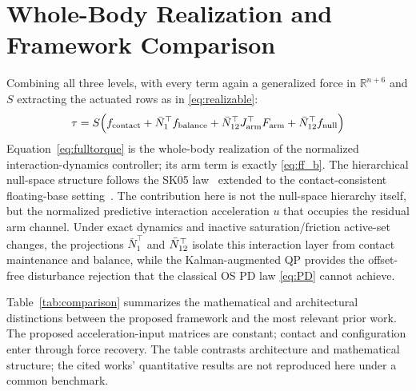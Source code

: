 \section{Whole-Body Realization and Framework Comparison}
\label{sec:torque}

Combining all three levels, with every term again a generalized force in
$\mathbb{R}^{n+6}$ and $S$ extracting the actuated rows as in
\eqref{eq:realizable}:
\begin{equation}\label{eq:fulltorque}
  \tau = S\Big(f_{\text{contact}}
       + \bar{N}_1^\top f_{\text{balance}}
       + \bar{N}_{12}^\top J_{\text{arm}}^\top F_{\text{arm}}
       + \bar{N}_{12}^\top f_{\text{null}}\Big)
\end{equation}
Equation~\eqref{eq:fulltorque} is the whole-body realization of the
normalized interaction-dynamics controller; its arm term is exactly
\eqref{eq:ff_b}.
The hierarchical null-space structure follows the SK05
law~\cite{sentis2005synthesis} extended to the contact-consistent
floating-base setting~\cite{khatib1987unified,righetti2011inverse}.
The contribution here is not the null-space hierarchy itself, but the
normalized predictive interaction acceleration $u$ that occupies the residual
arm channel. Under exact dynamics and inactive saturation/friction active-set
changes, the projections $\bar{N}_1^\top$ and $\bar{N}_{12}^\top$ isolate this
interaction layer from contact maintenance and balance, while the
Kalman-augmented QP provides the offset-free disturbance rejection that the
classical OS PD law \eqref{eq:PD} cannot achieve.

Table~\ref{tab:comparison} summarizes the mathematical and architectural
distinctions between the proposed framework and the most relevant prior
work. The proposed acceleration-input matrices are constant; contact and
configuration enter through force recovery. The table contrasts architecture
and mathematical structure; the cited works' quantitative results are not
reproduced here under a common benchmark.

